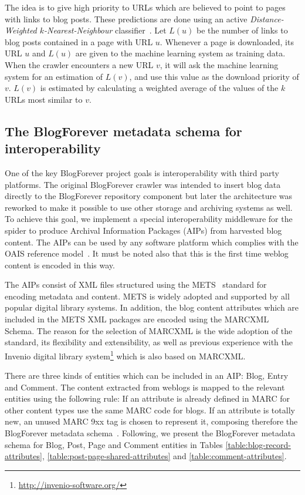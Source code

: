 The idea is to give high priority to URLs which are believed to 
point to pages with links to blog posts. These predictions are 
done using an active \emph{Distance-Weighted $k$-Nearest-Neighbour} 
classifier~\cite{dudani1976}. Let $L(u)$ be the number of links to blog 
posts contained in a page with URL $u$. Whenever a page is downloaded, 
its URL $u$ and $L(u)$ are given to the machine learning system as 
training data. When the crawler encounters a new URL $v$, it will ask the 
machine learning system for an estimation of $L(v)$, and use this value 
as the download priority of $v$. $L(v)$ is estimated by calculating a 
weighted average of the values of the $k$ URLs most similar to $v$.

\subsection{The BlogForever metadata schema for interoperability}
\label{interop}

One of the key BlogForever project goals is interoperability with third 
party platforms. The original BlogForever crawler was intended to
insert blog data directly to the BlogForever repository component but
later the architecture was reworked to make it possible to use
other storage and archiving systems as well. 
To achieve this goal, we implement a special interoperability middleware 
for the spider to produce Archival Information Packages (AIPs) from 
harvested blog content. The AIPs can be used by any software platform 
which complies with the OAIS reference model~\cite{lavoie2000meeting}. 
It must be noted also that this is the first time weblog content is 
encoded in this way.

The AIPs consist of XML files structured using the 
METS~\cite{cantara2005mets} standard for encoding metadata and 
content. METS is widely adopted and supported by all popular digital 
library systems. In addition, the blog content attributes which 
are included in the METS XML packages are encoded using the MARCXML
Schema\cite{marc2003official}. The reason for the selection of MARCXML 
is the wide adoption of the standard, its flexibility and extensibility, 
as well as previous experience with the Invenio digital library
system\footnote{\url{http://invenio-software.org/}} which is also based
on MARCXML.

There are three kinds of entities which can be included in an AIP: 
Blog, Entry and Comment. The content extracted from weblogs is mapped 
to the relevant entities using the following rule: If an attribute is 
already defined in MARC for other content types use the same MARC code 
for blogs. If an attribute is totally new, an unused MARC 9xx tag is 
chosen to represent it, composing therefore the BlogForever metadata 
schema~\cite{llopis2012d4}. Following, we present the BlogForever 
metadata schema for Blog, Post, Page and Comment entities in Tables 
\ref{table:blog-record-attributes}, 
\ref{table:post-page-shared-attributes} and 
\ref{table:comment-attributes}.

